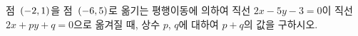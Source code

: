 점~$(-2{,}\mkern3mu\mathopen{}1)$을 점~$(-6{,}\mkern3mu\mathopen{}5)$로 옮기는 평행이동에 의하여 직선 $2x-5y-3=0$이 직선 $2x+py+q=0$으로 옮겨질 때, 상수 $p$, $q$에 대하여 $p+q$의 값을 구하시오.
